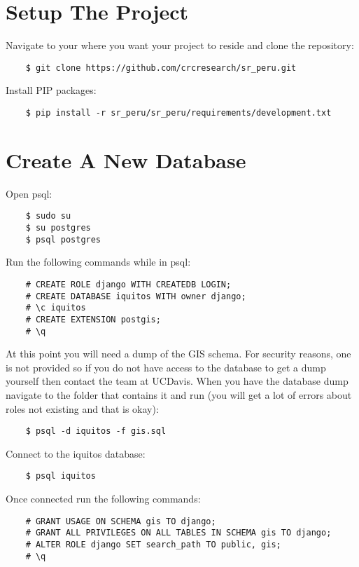 \documentclass{article}
\begin{document}
\section{Setup The Project}
Navigate to your where you want your project to reside and clone the repository:
\begin{verbatim}
    $ git clone https://github.com/crcresearch/sr_peru.git
\end{verbatim}
Install PIP packages:
\begin{verbatim}
    $ pip install -r sr_peru/sr_peru/requirements/development.txt
\end{verbatim}
\section{Create A New Database}
Open psql:
\begin{verbatim}
    $ sudo su
    $ su postgres
    $ psql postgres
\end{verbatim}
Run the following commands while in psql:
\begin{verbatim}
    # CREATE ROLE django WITH CREATEDB LOGIN;
    # CREATE DATABASE iquitos WITH owner django;
    # \c iquitos
    # CREATE EXTENSION postgis;
    # \q
\end{verbatim}
At this point you will need a dump of the GIS schema.  For security reasons, one is not provided so if you do not have access to the database to get a dump yourself then contact the team at UCDavis. When you have the database dump navigate to the folder that contains it and run (you will get a lot of errors about roles not existing and that is okay):
\begin{verbatim}
    $ psql -d iquitos -f gis.sql
\end{verbatim}
Connect to the iquitos database:
\begin{verbatim}
    $ psql iquitos
\end{verbatim}
Once connected run the following commands:
\begin{verbatim}
    # GRANT USAGE ON SCHEMA gis TO django;
    # GRANT ALL PRIVILEGES ON ALL TABLES IN SCHEMA gis TO django;
    # ALTER ROLE django SET search_path TO public, gis;
    # \q
\end{verbatim}
\end{document}
